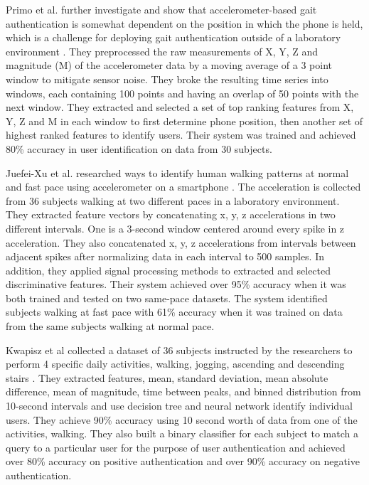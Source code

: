 \documentclass{soups}
\begin{document}
Primo et al. further investigate and show that accelerometer-based gait authentication is somewhat dependent on the position in which the phone is held, which is a challenge for deploying gait authentication outside of a laboratory environment \cite{primo:context}. They preprocessed the raw measurements of X, Y, Z and magnitude (M) of the accelerometer data by a moving average of a 3 point window to mitigate sensor noise. They broke the resulting time series into windows, each containing 100 points and having an overlap of 50 points with the next window. They extracted and selected a set of top ranking features from X, Y, Z and M in each window to first determine phone position, then another set of highest ranked features to identify users. Their system was trained and achieved 80\% accuracy in user identification on data from 30 subjects.

Juefei-Xu et al. researched ways to identify human walking patterns at normal and fast pace using accelerometer on a smartphone \cite{xu:pace}. The acceleration is collected from 36 subjects walking at two different paces in a laboratory environment. They extracted feature vectors by concatenating x, y, z accelerations in two different intervals. One is a 3-second window centered around every spike in z acceleration. They also concatenated x, y, z accelerations from intervals between adjacent spikes after normalizing data in each interval to 500 samples. In addition, they applied signal processing methods to extracted and selected discriminative features. Their system achieved over 95\% accuracy when it was both trained and tested on two same-pace datasets. The system identified subjects walking at fast pace with 61\% accuracy when it was trained on data from the same subjects walking at normal pace.

Kwapisz et al collected a dataset of 36 subjects instructed by the researchers to perform 4 specific daily activities, walking, jogging, ascending and descending stairs \cite{kwapisz:biometrics}. They extracted features, mean, standard deviation, mean absolute difference, mean of magnitude, time between peaks, and binned distribution from 10-second intervals and use decision tree and neural network identify individual users. They achieve 90\% accuracy using 10 second worth of data from one of the activities, walking. They also built a binary classifier for each subject to match a query to a particular user for the purpose of user authentication and achieved over 80\% accuracy on positive authentication and over 90\% accuracy on negative authentication.
\end{document}
